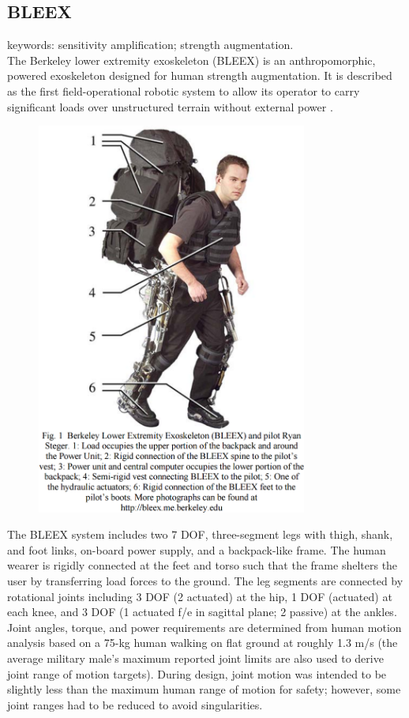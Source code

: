 \subsection{BLEEX}
\label{exo:bleex}

keywords: sensitivity amplification; strength augmentation.\\

The Berkeley lower extremity exoskeleton (BLEEX) is an anthropomorphic, powered exoskeleton designed for human strength augmentation.  It is described as the first field-operational robotic system to allow its operator to carry significant loads over unstructured terrain without external power \cite{bleex_design_2006}.

\begin{figure}[ht]
  \centering
  \includegraphics[width=3.5in]{exos/figs/bleex_exo.png}
\end{figure}

The BLEEX system includes two 7 DOF, three-segment legs with thigh, shank, and foot links, on-board power supply, and a backpack-like frame.  The human wearer is rigidly connected at the feet and torso such that the frame shelters the user by transferring load forces to the ground.  The leg segments are connected by rotational joints including 3 DOF (2 actuated) at the hip, 1 DOF (actuated) at each knee, and 3 DOF (1 actuated f/e in sagittal 
plane; 2 passive) at the ankles.  Joint angles, torque, and power requirements are determined from human motion analysis based on a 75-kg human walking on flat ground at roughly 1.3 m/s (the average military male's maximum reported joint limits are also used to derive joint range of motion targets).  During design, joint motion was intended to be slightly less than the maximum human range of motion for safety; however, some joint ranges had to be reduced to avoid singularities.

